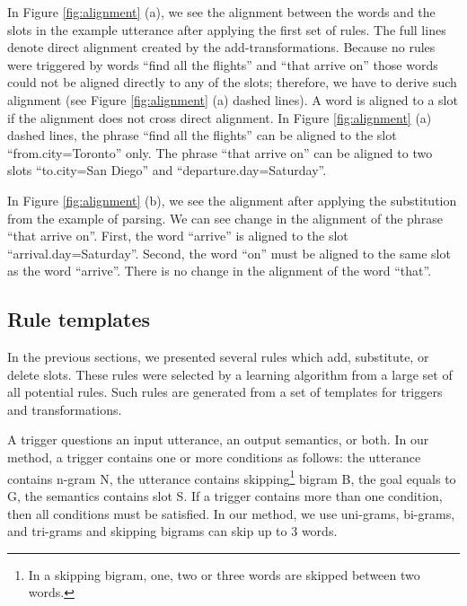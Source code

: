 \documentclass{article}
\begin{document}

In Figure \ref{fig:alignment} (a), we see the alignment between the words and the slots in the example utterance after applying the first set of rules. The full lines denote direct alignment created by the add-transformations. Because no rules were triggered by words ``find all the flights'' and ``that arrive on'' those words could not be aligned directly to any of the slots; therefore, we have to derive such alignment (see Figure \ref{fig:alignment} (a) dashed lines). A word is aligned to a slot if the alignment does not cross direct alignment.
In Figure \ref{fig:alignment} (a) dashed lines, the phrase ``find all the flights'' can be aligned to the slot ``from.city=Toronto'' only. The phrase ``that arrive on'' can be aligned to two slots ``to.city=San Diego'' and ``departure.day=Saturday''. 

In Figure \ref{fig:alignment} (b), we see the alignment after applying the substitution from the example of parsing. We can see change in the alignment of the phrase ``that arrive on''. First, the word ``arrive'' is aligned to the slot ``arrival.day=Saturday''. Second, the word ``on'' must be aligned to the same slot as the word ``arrive''. There is no change in the alignment of the word ``that''.

\subsection{Rule templates}
In the previous sections, we presented several rules which add, substitute, or delete slots. These rules were selected by a learning algorithm from a large set of all potential rules. Such rules are generated from a set of templates for triggers and transformations. 

A trigger 
questions an input utterance, an output semantics, or both. In our method, a trigger contains one or more conditions as follows: the utterance contains n-gram N, the utterance contains skipping\footnote{In a skipping bigram, one, two or three words are skipped between two words. 
} 
bigram B, the goal equals to G, the semantics contains slot S. If a trigger contains more than one condition, then all conditions must be satisfied. In our method, we use uni-grams, bi-grams, and tri-grams and skipping bigrams can skip up to 3 words.
\end{document}
